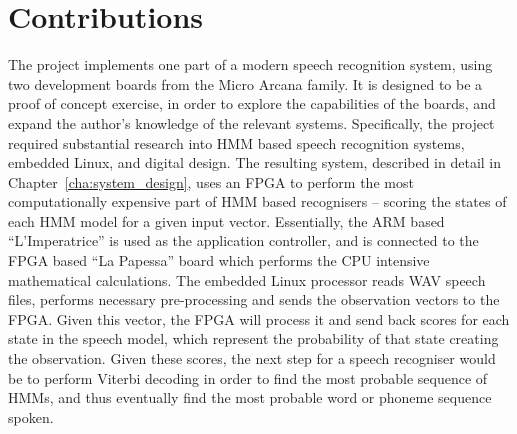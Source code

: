 \section{Contributions} %
\label{sec:contributions}
	The project implements one part of a modern speech recognition system, using two development boards from the Micro Arcana family.  It is designed to be a proof of concept exercise, in order to explore the capabilities of the boards, and expand the author's knowledge of the relevant systems.  Specifically, the project required substantial research into HMM based speech recognition systems, embedded Linux, and digital design.  The resulting system, described in detail in Chapter~\ref{cha:system_design}, uses an FPGA to perform the most computationally expensive part of HMM based recognisers -- scoring the states of each HMM model for a given input vector.  Essentially, the ARM based ``L'Imperatrice'' is used as the application controller, and is connected to the FPGA based ``La Papessa'' board which performs the CPU intensive mathematical calculations.  The embedded Linux processor reads WAV speech files, performs necessary pre-processing and sends the observation vectors to the FPGA.  Given this vector, the FPGA will process it and send back scores for each state in the speech model, which represent the probability of that state creating the observation.  Given these scores, the next step for a speech recogniser would be to perform Viterbi decoding in order to find the most probable sequence of HMMs, and thus eventually find the most probable word or phoneme sequence spoken.



